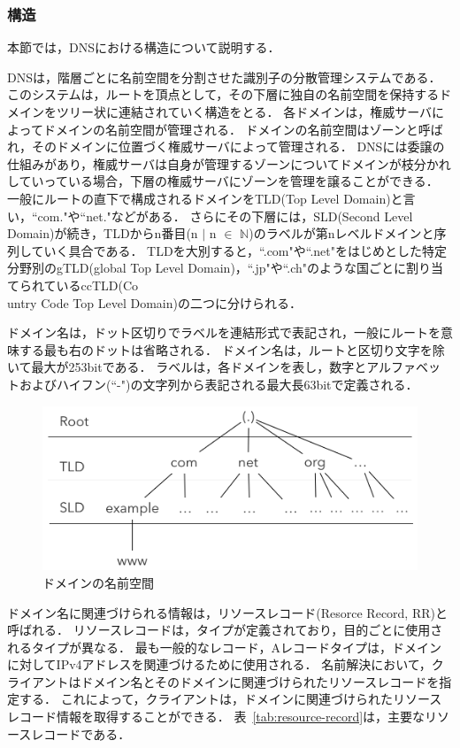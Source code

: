 \subsubsection{構造}
本節では，DNSにおける構造について説明する．

DNSは，階層ごとに名前空間を分割させた識別子の分散管理システムである．
このシステムは，ルートを頂点として，その下層に独自の名前空間を保持するドメインをツリー状に連結されていく構造をとる．
各ドメインは，権威サーバによってドメインの名前空間が管理される．
ドメインの名前空間はゾーンと呼ばれ，そのドメインに位置づく権威サーバによって管理される．
DNSには委譲の仕組みがあり，権威サーバは自身が管理するゾーンについてドメインが枝分かれしていっている場合，下層の権威サーバにゾーンを管理を譲ることができる．
一般にルートの直下で構成されるドメインをTLD(Top Level Domain)と言い，``com."や``net."などがある．
さらにその下層には，SLD(Second Level Domain)が続き，TLDからn番目(n $\mid$ n $\in$ $\mathbb{N}$)のラベルが第nレベルドメインと序列していく具合である．
TLDを大別すると，``.com"や``.net"をはじめとした特定分野別のgTLD(global Top Level Domain)，``.jp"や``.ch"のような国ごとに割り当てられているccTLD(Co\\untry Code Top Level Domain)の二つに分けられる．

ドメイン名は，ドット区切りでラベルを連結形式で表記され，一般にルートを意味する最も右のドットは省略される．
ドメイン名は，ルートと区切り文字を除いて最大が253bitである．
ラベルは，各ドメインを表し，数字とアルファベットおよびハイフン(``-")の文字列から表記される最大長63bitで定義される．

\begin{figure}[h]
 \centering
 \includegraphics[width=12.0cm]{figure/dns-architecture.png}
 \caption{ドメインの名前空間}
 \label{fig:dns-architecture}
\end{figure}



ドメイン名に関連づけられる情報は，リソースレコード(Resorce Record, RR)と呼ばれる．
リソースレコードは，タイプが定義されており，目的ごとに使用されるタイプが異なる．
最も一般的なレコード，Aレコードタイプは，ドメインに対してIPv4アドレスを関連づけるために使用される．
名前解決において，クライアントはドメイン名とそのドメインに関連づけられたリソースレコードを指定する．
これによって，クライアントは，ドメインに関連づけられたリソースレコード情報を取得することができる．
表~\ref{tab:resource-record}は，主要なリソースレコードである．


